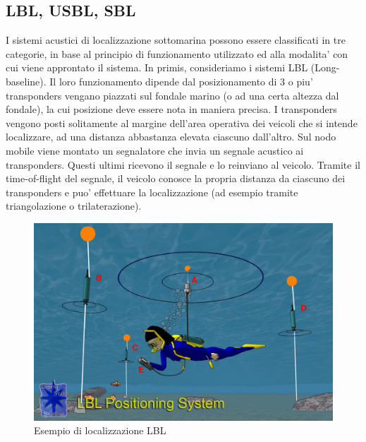 \subsection{LBL, USBL, SBL}
I sistemi acustici di localizzazione sottomarina possono essere classificati in tre categorie, in base al principio di funzionamento utilizzato ed alla modalita' con cui viene approntato il sistema. \cite{underwaterpositioning} \newline
In primis, consideriamo i sistemi LBL (Long-baseline).  Il loro funzionamento dipende dal posizionamento di 3 o piu' transponders vengano piazzati sul fondale marino (o ad una certa altezza dal fondale), la cui posizione deve essere nota in maniera precisa. 
I transponders vengono posti solitamente al margine dell'area operativa dei veicoli che si intende localizzare, ad una distanza abbastanza elevata ciascuno dall'altro. Sul nodo mobile viene montato un segnalatore che invia un segnale acustico ai transponders. Questi ultimi ricevono il segnale e lo reinviano al veicolo. Tramite il time-of-flight del segnale, il veicolo conosce la propria distanza da ciascuno dei transponders e puo' effettuare la localizzazione (ad esempio tramite triangolazione o trilaterazione).

\begin{figure}[H]
    \centering
	\includegraphics[scale=0.25]{LBL.jpg}
	\caption{ Esempio di localizzazione LBL}
	\label{fig:LBL}
\end{figure}
\newpage

